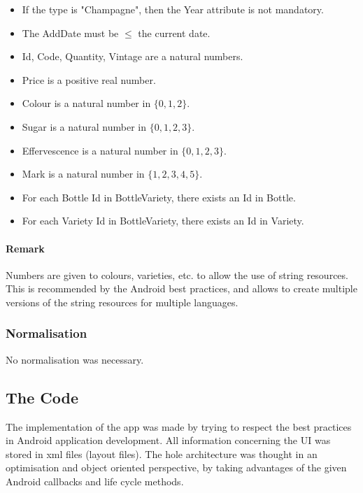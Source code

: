 \begin{itemize}
	\item If the type is "Champagne", then the Year attribute is not mandatory.
	\item The AddDate must be $\leq$ the current date.
	\item Id, Code, Quantity, Vintage are a natural numbers.
	\item Price is a positive real number.
	\item Colour is a natural number in $\{ 0, 1, 2\}$.
	\item Sugar is a natural number in $\{0, 1, 2, 3\}$.
	\item Effervescence is a natural number in $\{0, 1, 2, 3\}$.
	\item Mark is a natural number in $\{1, 2, 3, 4, 5\}$.
	\item For each Bottle Id in BottleVariety, there exists an Id in Bottle.
	\item For each Variety Id in BottleVariety, there exists an Id in Variety.
\end{itemize}

\paragraph{Remark}
Numbers are given to colours, varieties, etc. to allow the use of string resources. This is recommended by the Android best practices, and allows to create multiple versions of the string resources for multiple languages.

\subsubsection{Normalisation}

No normalisation was necessary.

\subsection{The Code}

The implementation of the app was made by trying to respect the best practices in Android application development. All information concerning the UI was stored in xml files (layout files). The hole architecture was thought in an optimisation and object oriented perspective, by taking advantages of the given Android callbacks and life cycle methods.\\


